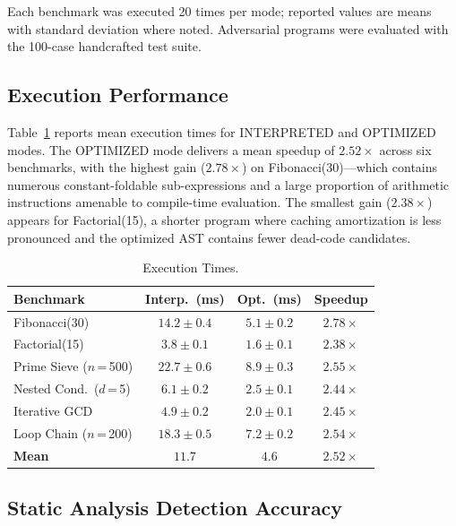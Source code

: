 \documentclass[conference]{IEEEtran}
\begin{document}
Each benchmark was executed 20 times per mode; reported values are
means with standard deviation where noted. Adversarial programs were
evaluated with the 100-case handcrafted test suite.

\subsection{Execution Performance}

Table~\ref{tab:perf} reports mean execution times for INTERPRETED and
OPTIMIZED modes. The OPTIMIZED mode delivers a mean speedup of
$2.52\times$ across six benchmarks, with the highest gain
($2.78\times$) on Fibonacci(30)—which contains numerous
constant-foldable sub-expressions and a large proportion of
arithmetic instructions amenable to compile-time evaluation. The
smallest gain ($2.38\times$) appears for Factorial(15), a shorter
program where caching amortization is less pronounced and the
optimized AST contains fewer dead-code candidates.

\begin{table}[t]
\caption{Execution Times.}
\label{tab:perf}
\centering
\renewcommand{\arraystretch}{1.18}
\small
\begin{tabular}{@{} l c c c @{}}
\toprule
\textbf{Benchmark} & \textbf{Interp.\ (ms)} &
\textbf{Opt.\ (ms)} & \textbf{Speedup} \\
\midrule
Fibonacci(30)              & $14.2 \pm 0.4$ & $5.1 \pm 0.2$ & $2.78\times$ \\
Factorial(15)              & $3.8  \pm 0.1$ & $1.6 \pm 0.1$ & $2.38\times$ \\
Prime Sieve ($n$\,=\,500)  & $22.7 \pm 0.6$ & $8.9 \pm 0.3$ & $2.55\times$ \\
Nested Cond.\ ($d$\,=\,5)  & $6.1  \pm 0.2$ & $2.5 \pm 0.1$ & $2.44\times$ \\
Iterative GCD              & $4.9  \pm 0.2$ & $2.0 \pm 0.1$ & $2.45\times$ \\
Loop Chain ($n$\,=\,200)   & $18.3 \pm 0.5$ & $7.2 \pm 0.2$ & $2.54\times$ \\
\midrule
\textbf{Mean}              & $11.7$         & $4.6$         & $\mathbf{2.52\times}$ \\
\bottomrule
\end{tabular}
\end{table}

\subsection{Static Analysis Detection Accuracy}
\end{document}
